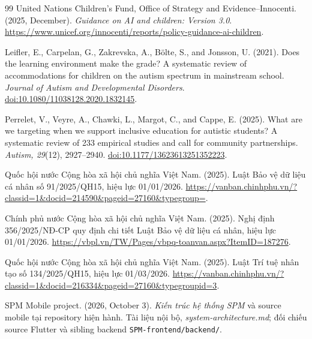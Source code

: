 \documentclass[11pt,a4paper]{article}
\begin{document}
\begin{thebibliography}{99}
United Nations Children's Fund, Office of Strategy and Evidence--Innocenti.
(2025, December).
\newblock \emph{Guidance on AI and children: Version 3.0}.
\newblock \url{https://www.unicef.org/innocenti/reports/policy-guidance-ai-children}.

Leifler, E., Carpelan, G., Zakrevska, A., Bölte, S., and Jonsson, U. (2021).
\newblock Does the learning environment make the grade? A systematic review of
accommodations for children on the autism spectrum in mainstream school.
\newblock \emph{Journal of Autism and Developmental Disorders}.
\newblock \href{https://doi.org/10.1080/11038128.2020.1832145}{doi:10.1080/11038128.2020.1832145}.

Perrelet, V., Veyre, A., Chawki, L., Margot, C., and Cappe, E. (2025).
\newblock What are we targeting when we support inclusive education for autistic
students? A systematic review of 233 empirical studies and call for community
partnerships.
\newblock \emph{Autism, 29}(12), 2927--2940.
\newblock \href{https://doi.org/10.1177/13623613251352223}{doi:10.1177/13623613251352223}.

Quốc hội nước Cộng hòa xã hội chủ nghĩa Việt Nam. (2025).
\newblock Luật Bảo vệ dữ liệu cá nhân số 91/2025/QH15, hiệu lực 01/01/2026.
\newblock \url{https://vanban.chinhphu.vn/?classid=1&docid=214590&pageid=27160&typegroup=}.

Chính phủ nước Cộng hòa xã hội chủ nghĩa Việt Nam. (2025).
\newblock Nghị định 356/2025/NĐ-CP quy định chi tiết Luật Bảo vệ dữ liệu cá nhân,
hiệu lực 01/01/2026.
\newblock \url{https://vbpl.vn/TW/Pages/vbpq-toanvan.aspx?ItemID=187276}.

Quốc hội nước Cộng hòa xã hội chủ nghĩa Việt Nam. (2025).
\newblock Luật Trí tuệ nhân tạo số 134/2025/QH15, hiệu lực 01/03/2026.
\newblock \url{https://vanban.chinhphu.vn/?classid=1&docid=216334&pageid=27160&typegroupid=3}.

SPM Mobile project. (2026, October 3).
\newblock \emph{Kiến trúc hệ thống SPM} và source mobile tại repository hiện hành.
\newblock Tài liệu nội bộ, \textit{system-architecture.md}; đối chiếu source
Flutter và sibling backend \texttt{SPM-frontend/backend/}.

\end{thebibliography}
\end{document}
